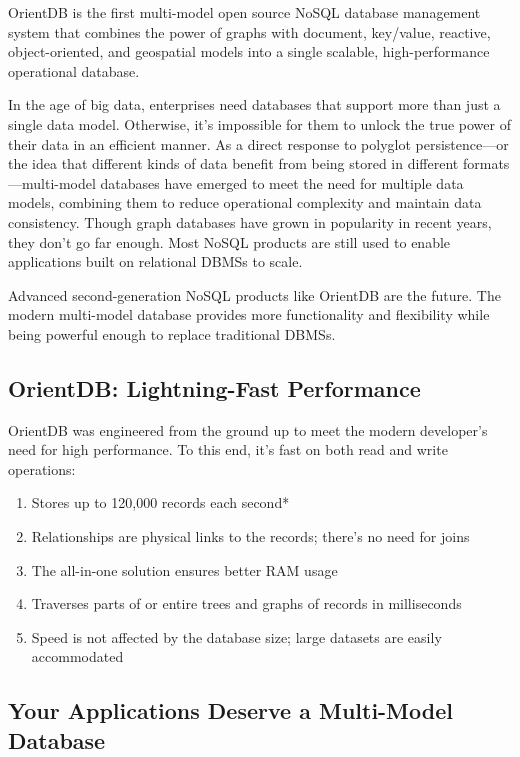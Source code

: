 \documentclass[
	final,
	a4paper,
	oneside,
	parskip=half,
	headings=standardclasses,
	headings=big,
	pointednumbers,
    fleqn
]{scrartcl}
\begin{document}
\begin{multicols*}{2}
            OrientDB is the first multi-model open source NoSQL database management system that combines the power of graphs with document, key/value, reactive, object-oriented, and geospatial models into a single scalable, high-performance operational database.
    
            In the age of big data, enterprises need databases that support more than just a single data model. Otherwise, it’s impossible for them to unlock the true power of their data in an efficient manner.
            As a direct response to polyglot persistence—or the idea that different kinds of data benefit from being stored in different formats—multi-model databases have emerged to meet the need for multiple data models, combining them to reduce operational complexity and maintain data consistency. Though graph databases have grown in popularity in recent years, they don’t go far enough. Most NoSQL products are still used to enable applications built on relational DBMSs to scale.
    
            Advanced second-generation NoSQL products like OrientDB are the future. The modern multi-model database provides more functionality and flexibility while being powerful enough to replace traditional DBMSs.

        \subsection{OrientDB: Lightning-Fast Performance}

            OrientDB was engineered from the ground up to meet the modern developer’s need for high performance. To this end, it’s fast on both read and write operations:

            \begin{enumerate}
                \item Stores up to 120,000 records each second*
                \item Relationships are physical links to the records; there’s no need for joins
                \item The all-in-one solution ensures better RAM usage
                \item Traverses parts of or entire trees and graphs of records in milliseconds
                \item Speed is not affected by the database size; large datasets are easily accommodated
            \end{enumerate}

        \subsection{Your Applications Deserve a Multi-Model Database}
            

\end{multicols*}
\end{document}
